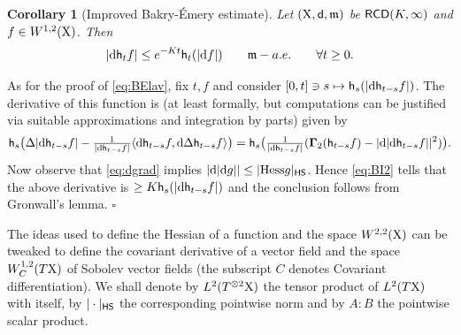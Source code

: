 \documentclass[11pt]{article}
\numberwithin{equation}{section}
\newtheorem{corollary}[theorem]{Corollary}
\newenvironment{idea}{\removelastskip\par\medskip   %
\noindent{\em Idea of the proof} \rm}{\penalty-20\null\hfill$\square$\par\medbreak}
\newcommand{\X}{{\rm X}}
\newcommand{\sfd}{{\sf d}}
\newcommand{\mm}{{\mathfrak m}}
\newcommand{\RCD}{{\sf RCD}}
\renewcommand{\d}{{\rm d}}
\newcommand{\Hess}{{\rm Hess}}
\newcommand{\h}{{\sf h}} %
\newcommand\la{\langle}
\newcommand\ra{\rangle}
\newcommand{\HS}{\sf HS}
\newcommand{\Ggamma}{{\mathbf \Gamma}}
\begin{document}
\begin{corollary}[Improved Bakry-\'Emery estimate] Let $(\X,\sfd,\mm)$ be $\RCD(K,\infty)$ and $f\in W^{1,2}(\X)$. Then
\begin{equation}
\label{eq:BEimpr}
|\d\h_tf|\leq e^{-Kt}\h_t(|\d f|)\qquad\mm-a.e.\qquad\forall t\geq 0.
\end{equation}
\end{corollary}
\begin{idea}
As for the proof of \eqref{eq:BElav}, fix $t,f$ and consider $[0,t]\ni s\mapsto \h_{s}(|\d\h_{t-s}f|)$. The derivative of this function is (at least formally, but computations can be justified via suitable approximations and integration by parts) given by
\[
\begin{split}
\h_s\big(\Delta|\d\h_{t-s}f|-\tfrac1{|\d \h_{t-s}f|}\la\d \h_{t-s}f,\d \Delta \h_{t-s}f\ra\big)=\h_s\big(\tfrac1{|\d \h_{t-s}f|}(\Ggamma_2(\h_{t-s}f) -|\d|\d\h_{t-s}f||^2)\big).
\end{split}
\]
Now observe that  \eqref{eq:dgrad} implies  $|\d|\d g||\leq |\Hess g|_{\HS}$. Hence \eqref{eq:BI2} tells that the above derivative is $\geq K\h_s(|\d \h_{t-s}f|)$ and the conclusion follows from Gronwall's lemma.
\end{idea}

The ideas used to define the Hessian of a function and the space $W^{2,2}(\X)$ can be tweaked to define the covariant derivative of a vector field and the space $W^{1,2}_C(T\X)$ of Sobolev vector fields (the subscript $C$ denotes Covariant differentiation). We shall denote by $L^2(T^{\otimes 2}\X)$ the tensor product of $L^2(T\X)$ with itself, by $|\cdot|_{\HS}$ the corresponding pointwise norm and by $A: B$ the pointwise scalar product. 
\end{document}
